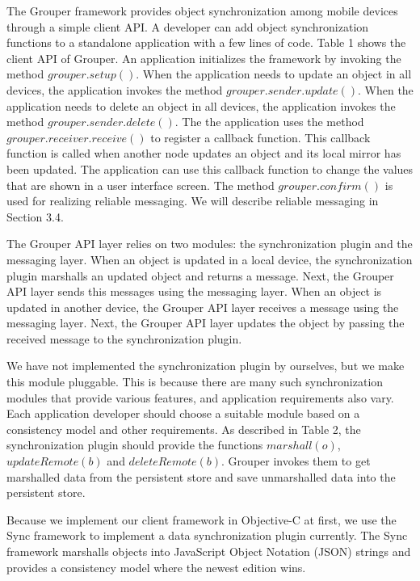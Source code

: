 \documentclass[twocolumn,10pt]{article}
\begin{document}
The Grouper framework provides object synchronization among mobile devices through a simple client API.
A developer can add object synchronization functions to a standalone application with a few lines of code.
Table 1 shows the client API of Grouper.
An application initializes the framework by invoking the method $grouper.setup()$.
When the application needs to update an object in all devices, the application invokes the method $grouper.sender.update()$.
When the application needs to delete an object in all devices, the application invokes the method $grouper.sender.delete()$.
The the application uses the method $grouper.receiver.receive()$ to register a callback function.
This callback function is called when another node updates an object and its local mirror has been updated.
The application can use this callback function to change the values that are shown in a user interface screen.
The method $grouper.confirm()$ is used for realizing reliable messaging.
We will describe reliable messaging in Section 3.4.

The Grouper API layer relies on two modules: the synchronization plugin and the messaging layer.
When an object is updated in a local device, the synchronization plugin marshalls an updated object and returns a message.
Next, the Grouper API layer sends this messages using the messaging layer.
When an object is updated in another device, the Grouper API layer receives a message using the messaging layer.
Next, the Grouper API layer updates the object by passing the received message to the synchronization plugin.

We have not implemented the synchronization plugin by ourselves, but we make this module pluggable.
This is because there are many such synchronization modules that provide various features, and application requirements also vary.
Each application developer should choose a suitable module based on a consistency model and other requirements.
As described in Table 2, the synchronization plugin should provide the functions $marshall(o)$, $updateRemote(b)$ and $deleteRemote(b)$.
Grouper invokes them to get marshalled data from the persistent store and save unmarshalled data into the persistent store.

Because we implement our client framework in Objective-C at first, we use the Sync framework\cite{sync} to implement a data synchronization plugin currently.
The Sync framework marshalls objects into JavaScript Object Notation (JSON) strings and provides a consistency model where the newest edition wins.
\end{document}
